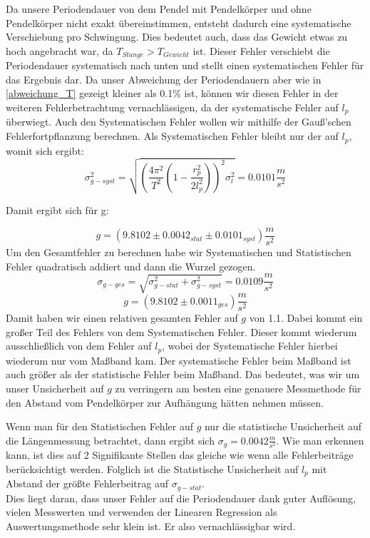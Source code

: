 \documentclass[twoside]{protokoll}
\begin{document}
Da unsere Periodendauer von dem Pendel mit Pendelkörper und ohne Pendelkörper nicht exakt übereinstimmen, entsteht dadurch eine systematische Verschiebung pro Schwingung.
Dies bedeutet auch, dass das Gewicht etwas zu hoch angebracht war, da $T_{Stange} > T_{Gewicht}$ ist.
Dieser Fehler verschiebt die Periodendauer systematisch nach unten und stellt einen systematischen Fehler für das Ergebnis dar.
Da unser Abweichung der Periodendauern aber wie in \ref{abweichung_T} gezeigt kleiner als 0.1\% ist, können wir diesen Fehler in der weiteren Fehlerbetrachtung vernachlässigen, da der systematische Fehler auf $l_p$ überwiegt.
Auch den Systematischen Fehler wollen wir mithilfe der Gauß'schen Fehlerfortpflanzung berechnen.
Als Systematischen Fehler bleibt nur der auf $l_p$, womit sich ergibt:
\begin{equation}
    \sigma_{g-syst}^2 =  \sqrt{\left(\frac{4\pi^2}{T^2}\left(1-\frac{r_p^2}{2l_p^2}\right)\right)^2\sigma_l^2} = 0.0101 \frac{m}{s^2}
\end{equation}

Damit ergibt sich für g:

\begin{equation}
    g = (9.8102 \pm 0.0042_{stat} \pm 0.0101_{syst}) \frac{m}{s^2}
\end{equation}
Um den Gesamtfehler zu berechnen habe wir Systematischen und Statistischen Fehler quadratisch addiert und dann die Wurzel gezogen.
\begin{equation}
    \sigma_{g-ges} = \sqrt{\sigma_{g-stat}^2 + \sigma_{g-syst}^2} = 0.0109 \frac{m}{s^2}
\end{equation}
\begin{equation}
    g = (9.8102 \pm 0.0011_{ges}) \frac{m}{s^2}
\end{equation}
Damit haben wir einen relativen gesamten Fehler auf $g$ von 1.1\textperthousand.
Dabei kommt ein großer Teil des Fehlers von dem Systematischen Fehler.
Dieser kommt wiederum ausschließlich von dem Fehler auf $l_p$, wobei der Systematische Fehler hierbei wiederum nur vom Maßband kam.
Der systematische Fehler beim Maßband ist auch größer als der statistische Fehler beim Maßband.
Das bedeutet, was wir um unser Unsicherheit auf $g$ zu verringern am besten eine genauere Messmethode für den Abstand vom Pendelkörper zur Aufhängung hätten nehmen müssen.

Wenn man für den Statistischen Fehler auf $g$ nur die statistische Unsicherheit auf die Längenmessung betrachtet, dann ergibt sich $\sigma_{g} = 0.0042 \frac{m}{s^2}$.
Wie man erkennen kann, ist dies auf 2 Signifikante Stellen das gleiche wie wenn alle  Fehlerbeiträge berücksichtigt werden.
Folglich ist die Statistische Unsicherheit auf $l_p$ mit Abstand der größte Fehlerbeitrag auf $\sigma_{g-stat}$. \\
Dies liegt daran, dass unser Fehler auf die Periodendauer dank guter Auflösung, vielen Messwerten und verwenden der Linearen Regression als Auswertungsmethode sehr klein ist. 
Er also vernachlässigbar wird. \\
\end{document}
